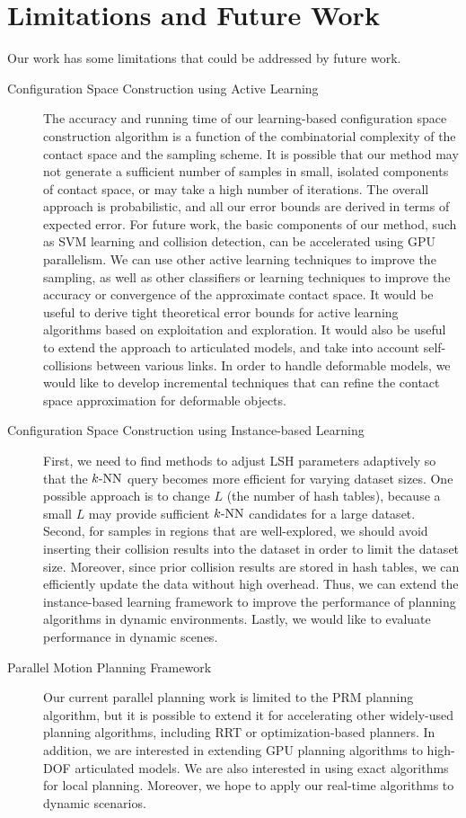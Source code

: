 \section{Limitations and Future Work}
Our work has some limitations that could be addressed by future work.
\begin{description}
\item[Configuration Space Construction using Active Learning]
The accuracy and running time of our learning-based configuration space construction algorithm is a function of the combinatorial complexity of the contact
space and the sampling scheme. It is possible that our method may not generate a sufficient number of samples in small,
isolated components of contact space, or may take a high number of iterations.
The overall approach is probabilistic, and all our error bounds are derived in terms of expected error.
For future work, the basic components of our method, such as SVM learning and collision detection, can be accelerated using GPU parallelism. We can use other active learning techniques to improve the sampling, as well as other classifiers or learning techniques to improve the accuracy or convergence of the approximate contact space. It would be useful to derive tight theoretical error bounds for active learning algorithms based on exploitation and exploration. It would also be useful to extend the approach to articulated models, and take into account self-collisions between various links.
In order to handle deformable models, we would like to develop incremental techniques that can refine the contact
space approximation for deformable objects.
\item[Configuration Space Construction using Instance-based Learning] First, we need to find methods to adjust LSH parameters adaptively so that the $k\text{-NN}$ query becomes more efficient for varying dataset sizes. One possible approach is to change $L$ (the number of hash tables), because a small $L$ may provide sufficient $k\text{-NN}$ candidates for a large dataset. Second, for samples in regions that are well-explored, we should avoid inserting their collision results into the dataset in order to limit the dataset size. Moreover, since prior collision results are stored in hash tables, we can efficiently update the data without high overhead. Thus, we can extend the instance-based learning framework to improve the performance of planning algorithms in dynamic environments. Lastly, we would like to evaluate performance in dynamic scenes.
\item[Parallel Motion Planning Framework] Our current parallel planning work is limited to the PRM planning algorithm, but it is possible to extend it for accelerating other widely-used planning algorithms, including RRT or optimization-based planners. In addition, we are interested in extending GPU planning algorithms to high-DOF articulated models. We are also interested in using exact algorithms for local planning. Moreover, we hope to apply our real-time algorithms to dynamic scenarios.

\end{description}
